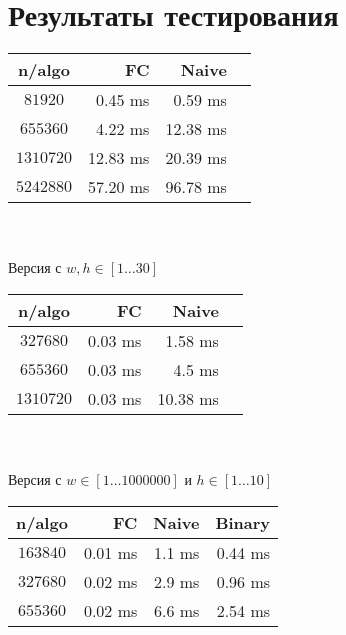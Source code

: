 \documentclass[a4paper,12pt]{article}
\begin{document}
\section{Результаты тестирования}

\vspace{1em}
\begin{tabular}{|c|r|r|r|}
\hline
n/algo & FC & Naive \\
\hline
$81920$ & 0.45 ms & 0.59 ms \\
\hline
$655360$ & 4.22 ms & 12.38 ms \\
\hline
$1310720$ & 12.83 ms & 20.39 ms \\
\hline
$5242880$ & 57.20 ms & 96.78 ms \\
\hline
\end{tabular}
\\
\\ Версия с $w, h \in [1 \dots 30]$
\\
\begin{tabular}{|c|r|r|r|}
\hline
n/algo & FC & Naive \\
\hline
$327680$ & 0.03 ms & 1.58 ms \\
\hline
$655360$ & 0.03 ms & 4.5 ms \\
\hline
$1310720$ & 0.03 ms & 10.38 ms \\
\hline
\end{tabular}
\\
\\ Версия с $w \in [1 \dots 1000000]$ и $h \in [1 \dots 10]$
\\
\begin{tabular}{|c|r|r|r|}
\hline
n/algo & FC & Naive & Binary \\
\hline
$163840$ & 0.01 ms & 1.1 ms & 0.44 ms\\
\hline
$327680$ & 0.02 ms & 2.9 ms & 0.96 ms\\
\hline
$655360$ & 0.02 ms & 6.6 ms & 2.54 ms\\
\hline
\end{tabular}
\end{document}
